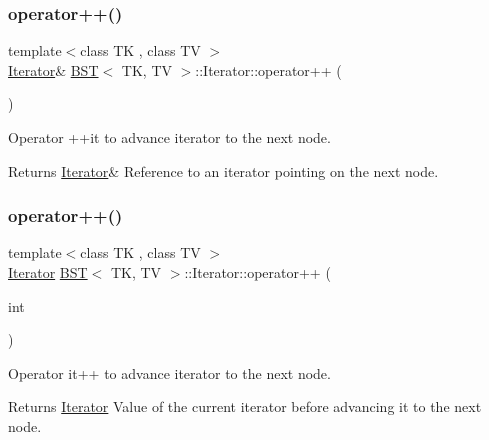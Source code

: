 \subsubsection{\texorpdfstring{operator++()}{operator++()}\hspace{0.1cm}{\footnotesize\ttfamily [1/2]}}
{\footnotesize\ttfamily template$<$class TK , class TV $>$ \\
\hyperlink{classBST_1_1Iterator}{Iterator}\& \hyperlink{classBST}{B\+ST}$<$ TK, TV $>$\+::Iterator\+::operator++ (\begin{DoxyParamCaption}{ }\end{DoxyParamCaption})\hspace{0.3cm}{\ttfamily [inline]}}



Operator ++it to advance iterator to the next node. 

\begin{DoxyReturn}{Returns}
\hyperlink{classBST_1_1Iterator}{Iterator}\& Reference to an iterator pointing on the next node. 
\end{DoxyReturn}
\mbox{\label{classBST_1_1Iterator_ab4da22880469dff452dfe4f393cbcd29}} 
\subsubsection{\texorpdfstring{operator++()}{operator++()}\hspace{0.1cm}{\footnotesize\ttfamily [2/2]}}
{\footnotesize\ttfamily template$<$class TK , class TV $>$ \\
\hyperlink{classBST_1_1Iterator}{Iterator} \hyperlink{classBST}{B\+ST}$<$ TK, TV $>$\+::Iterator\+::operator++ (\begin{DoxyParamCaption}\item[{int}]{ }\end{DoxyParamCaption})\hspace{0.3cm}{\ttfamily [inline]}}



Operator it++ to advance iterator to the next node. 

\begin{DoxyReturn}{Returns}
\hyperlink{classBST_1_1Iterator}{Iterator} Value of the current iterator before advancing it to the next node. 
\end{DoxyReturn}
\mbox{\label{classBST_1_1Iterator_aceb00c5bee59057733bb7fcae044550c}} 
